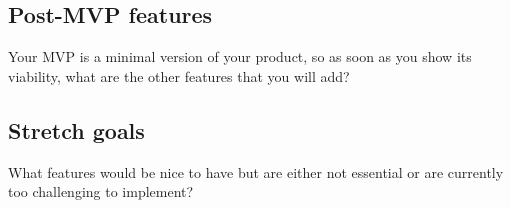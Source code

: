 \documentclass{article}
\begin{document}
\subsection{Post-MVP features}
Your MVP is a minimal version of your product, so as soon as you show its viability,
what are the other features that you will add?

\subsection{Stretch goals}
What features would be nice to have but are either not essential or are currently too challenging to implement?





    
\end{document}
